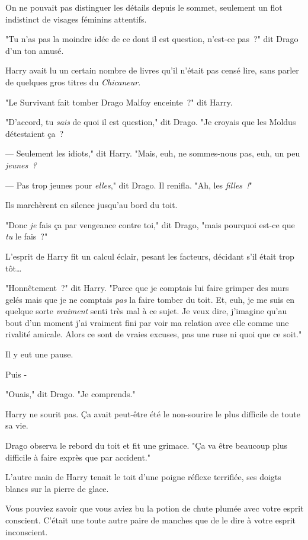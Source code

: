 \later

On ne pouvait pas distinguer les détails depuis le sommet, seulement un flot indistinct de visages féminins attentifs.

"Tu n'as pas la moindre idée de ce dont il est question, n'est-ce pas~?" dit Drago d'un ton amusé.

Harry avait lu un certain nombre de livres qu'il n'était pas censé lire, sans parler de quelques gros titres du \emph{Chicaneur}.

"Le Survivant fait tomber Drago Malfoy enceinte~?" dit Harry.

"D'accord, tu \emph{sais} de quoi il est question," dit Drago. "Je croyais que les Moldus détestaient ça~?

--- Seulement les idiots," dit Harry. "Mais, euh, ne sommes-nous pas, euh, un peu \emph{jeunes~?}

--- Pas trop jeunes pour \emph{elles}," dit Drago. Il renifla. "Ah, les \emph{filles~!}"

Ils marchèrent en silence jusqu'au bord du toit.

"Donc \emph{je} fais ça par vengeance contre toi," dit Drago, "mais pourquoi est-ce que \emph{tu} le fais~?"

L'esprit de Harry fit un calcul éclair, pesant les facteurs, décidant s'il était trop tôt…

"Honnêtement~?" dit Harry. "Parce que je comptais lui faire grimper des murs gelés mais que je ne comptais \emph{pas} la faire tomber du toit. Et, euh, je me suis en quelque sorte \emph{vraiment} senti très mal à ce sujet. Je veux dire, j'imagine qu'au bout d'un moment j'ai vraiment fini par voir ma relation avec elle comme une rivalité amicale. Alors ce sont de vraies excuses, pas une ruse ni quoi que ce soit."

Il y eut une pause.

Puis -

"Ouais," dit Drago. "Je comprends."

Harry ne sourit pas. Ça avait peut-être été le non-sourire le plus difficile de toute sa vie.

Drago observa le rebord du toit et fit une grimace. "Ça va être beaucoup plus difficile à faire exprès que par accident."

\later

L'autre main de Harry tenait le toit d'une poigne réflexe terrifiée, ses doigts blancs sur la pierre de glace.

Vous pouviez savoir que vous aviez bu la potion de chute plumée avec votre esprit conscient. C'était une toute autre paire de manches que de le dire à votre esprit inconscient.

